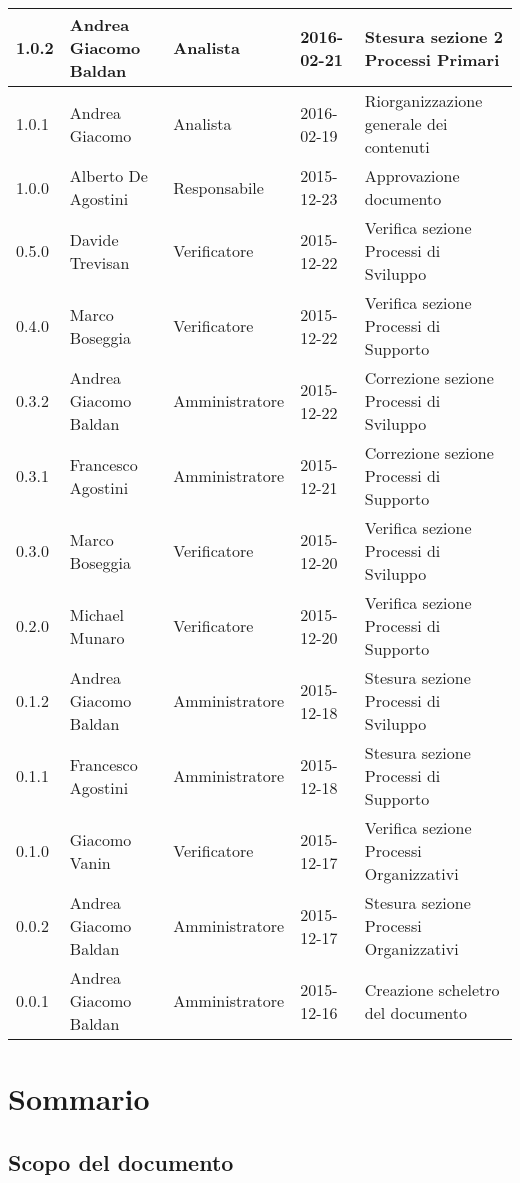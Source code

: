\documentclass{scalatekids-article}
\begin{document}
\begin{center}
\begin{longtable}{| l | l | l | l | p{5cm} |}
    \hline
    1.0.2 & Andrea Giacomo Baldan & Analista & 2016-02-21 & Stesura sezione 2 Processi Primari\\
    \hline
    1.0.1 & Andrea Giacomo & Analista & 2016-02-19 & Riorganizzazione generale dei contenuti\\
    \hline
    1.0.0 & Alberto De Agostini & Responsabile & 2015-12-23 & Approvazione documento\\
    \hline
    0.5.0 & Davide Trevisan & Verificatore & 2015-12-22 & Verifica sezione Processi di Sviluppo\\
    \hline
    0.4.0 & Marco Boseggia & Verificatore & 2015-12-22 & Verifica sezione Processi di Supporto\\
    \hline
    0.3.2 & Andrea Giacomo Baldan & Amministratore & 2015-12-22 & Correzione sezione Processi di Sviluppo\\
    \hline
    0.3.1 & Francesco Agostini & Amministratore & 2015-12-21 & Correzione sezione Processi di Supporto\\
    \hline
    0.3.0 & Marco Boseggia & Verificatore & 2015-12-20 & Verifica sezione Processi di Sviluppo\\
    \hline
    0.2.0 & Michael Munaro & Verificatore & 2015-12-20 & Verifica sezione Processi di Supporto\\
    \hline
    0.1.2 & Andrea Giacomo Baldan & Amministratore & 2015-12-18 & Stesura sezione Processi di Sviluppo\\
    \hline
    0.1.1 & Francesco Agostini & Amministratore & 2015-12-18 & Stesura sezione Processi di Supporto\\
    \hline
    0.1.0 & Giacomo Vanin & Verificatore & 2015-12-17 & Verifica sezione Processi Organizzativi\\
    \hline
    0.0.2 & Andrea Giacomo Baldan & Amministratore & 2015-12-17 & Stesura sezione Processi Organizzativi\\
    \hline
    0.0.1 & Andrea Giacomo Baldan & Amministratore & 2015-12-16 & Creazione scheletro del documento\\
    \hline
  \end{longtable}
\end{center}
\tableofcontents
\newpage
{}

\section{Sommario}

\subsection{Scopo del documento}
\end{document}
